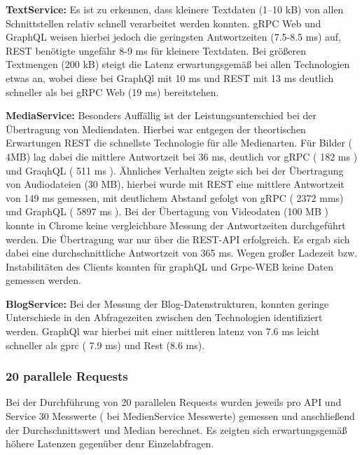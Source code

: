 \clearpage
\textbf{TextService:}  
Es ist zu erkennen, dass kleinere Textdaten (1–10 kB) von allen Schnittstellen relativ schnell verarbeitet werden konnten. gRPC Web und GraphQL weisen hierbei jedoch die geringsten Antwortzeiten (7.5-8.5 ms) auf, REST benötigte ungefähr 8-9 ms für kleinere Textdaten. Bei größeren Textmengen (200 kB) steigt die Latenz erwartungsgemäß bei allen Technologien etwas an, wobei diese bei GraphQl mit 10 ms und REST mit 13 ms deutlich schneller als bei gRPC Web (19 ms) bereitstehen. 

\textbf{MediaService:}  
Besonders Auffällig ist der Leistungsunterschied bei der Übertragung von Mediendaten.
Hierbei war entgegen der theortischen Erwartungen REST die schnellste Technologie für alle Medienarten. Für Bilder ( 4MB) lag dabei die mittlere Antwortzeit bei 36 ms, deutlich vor gRPC ( 182 ms ) und GraqhQL ( 511 ms ).
Ähnliches Verhalten zeigte sich bei der Übertragung von Audiodateien (30 MB), hierbei wurde mit REST eine mittlere Antwortzeit von 149 ms gemessen, mit deutlichem Abstand gefolgt von gRPC ( 2372 mms) und GraphQL ( 5897  ms ).
Bei der Übertagung von Videodaten (100 MB ) konnte in Chrome keine vergleichbare Messung der Antwortzeiten durchgeführt werden. Die Übertragung war nur über die REST-API erfolgreich. Es ergab sich dabei eine durchschnittliche Antwortzeit von 365 ms. Wegen großer Ladezeit bzw. Instabilitäten des Clients konnten für graphQL und Grpc-WEB keine Daten gemessen werden. 


\textbf{BlogService:}  
Bei der Messung der Blog-Datenstrukturen, konnten geringe Unterschiede in den Abfragezeiten zwischen den Technologien identifiziert werden. GraphQl war hierbei mit einer mittleren latenz von 7.6 ms leicht schneller als gprc ( 7.9 ms) und Rest (8.6 ms).

\clearpage
\subsubsection{20 parallele Requests}
Bei der Durchführung von 20 parallelen Requests wurden jeweils pro API und Service 30 Messwerte ( bei MedienService Messwerte) gemessen und anschließend der Durchschnittswert und Median berechnet. Es zeigten sich erwartungsgemäß höhere Latenzen gegenüber denr Einzelabfragen. 

